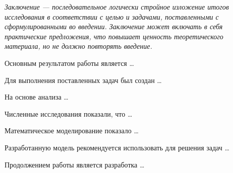\noskipnonumchapter{\conclusionname}


\textit{Заключение --- последовательное логически стройное изложение итогов исследования в соответствии с целью и задачами, поставленными с сформулированными во введении.
Заключение может включать в себя практические предложения, что повышает ценность теоретического материала, но не должно повторять введение.}
\bigskip

Основным результатом работы является \dots

Для выполнения поставленных задач был создан \dots

На основе анализа \dots

Численные исследования показали, что \dots

Математическое моделирование показало \dots

Разработанную модель рекомендуется использовать для решения задач \dots

Продолжением работы является разработка \dots
